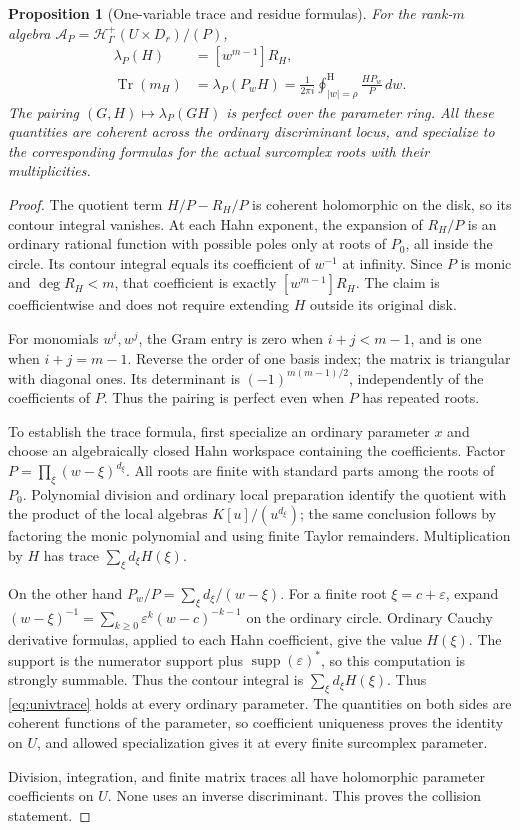 \documentclass[11pt,oneside]{article}
\numberwithin{equation}{section}
\newtheorem{proposition}[theorem]{Proposition}
\theoremstyle{definition}
\theoremstyle{remark}\newtheorem{remark}[theorem]{Remark}
\newcommand{\Hp}{\mathcal H^{+}_{\Gamma}}
\newcommand{\supp}{\operatorname{supp}}
\newcommand{\Tr}{\operatorname{Tr}}
\newcommand{\hoint}{\mathop{\oint}\nolimits^{\mathrm H}}
\begin{document}
\begin{proposition}[One-variable trace and residue formulas]\label{prop:univtrace}
For the rank-\(m\) algebra \(\mathcal A_P=\Hp(U\times D_r)/(P)\),
\begin{align}
 \lambda_P(H)&=[w^{m-1}]R_H,\label{eq:univresidue}\\
 \Tr(m_H)&=\lambda_P(P_wH)
 =\frac1{2\pi i}\hoint_{|w|=\rho}\frac{HP_w}{P}\,dw.
 \label{eq:univtrace}
\end{align}
The pairing \((G,H)\mapsto\lambda_P(GH)\) is perfect over the parameter ring. All these quantities are coherent across the ordinary discriminant locus, and specialize to the corresponding formulas for the actual surcomplex roots with their multiplicities.
\end{proposition}
\begin{proof}
The quotient term \(H/P-R_H/P\) is coherent holomorphic on the disk, so its contour integral vanishes. At each Hahn exponent, the expansion of \(R_H/P\) is an ordinary rational function with possible poles only at roots of \(P_0\), all inside the circle. Its contour integral equals its coefficient of \(w^{-1}\) at infinity. Since \(P\) is monic and \(\deg R_H<m\), that coefficient is exactly \([w^{m-1}]R_H\). The claim is coefficientwise and does not require extending \(H\) outside its original disk.

For monomials \(w^i,w^j\), the Gram entry is zero when \(i+j<m-1\), and is one when \(i+j=m-1\). Reverse the order of one basis index; the matrix is triangular with diagonal ones. Its determinant is \((-1)^{m(m-1)/2}\), independently of the coefficients of \(P\). Thus the pairing is perfect even when \(P\) has repeated roots.

To establish the trace formula, first specialize an ordinary parameter \(x\) and choose an algebraically closed Hahn workspace containing the coefficients. Factor \(P=\prod_\xi(w-\xi)^{d_\xi}\). All roots are finite with standard parts among the roots of \(P_0\). Polynomial division and ordinary local preparation identify the quotient with the product of the local algebras \(K[u]/(u^{d_\xi})\); the same conclusion follows by factoring the monic polynomial and using finite Taylor remainders. Multiplication by \(H\) has trace \(\sum_\xi d_\xi H(\xi)\).

On the other hand \(P_w/P=\sum_\xi d_\xi/(w-\xi)\). For a finite root \(\xi=c+\varepsilon\), expand \((w-\xi)^{-1}=\sum_{k\geq0}\varepsilon^k(w-c)^{-k-1}\) on the ordinary circle. Ordinary Cauchy derivative formulas, applied to each Hahn coefficient, give the value \(H(\xi)\). The support is the numerator support plus \(\supp(\varepsilon)^*\), so this computation is strongly summable. Thus the contour integral is \(\sum_\xi d_\xi H(\xi)\). Thus \eqref{eq:univtrace} holds at every ordinary parameter. The quantities on both sides are coherent functions of the parameter, so coefficient uniqueness proves the identity on \(U\), and allowed specialization gives it at every finite surcomplex parameter.

Division, integration, and finite matrix traces all have holomorphic parameter coefficients on \(U\). None uses an inverse discriminant. This proves the collision statement.
\end{proof}
\end{document}
